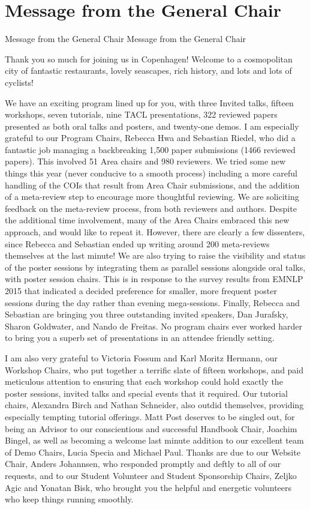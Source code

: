 \section{Message from the General Chair}\vspace{2em}
\setheaders%
    {Message from the General Chair}%
    {Message from the General Chair}
\thispagestyle{emptyheader}

\setlength{\parskip}{1ex}

Thank you so much for joining us in Copenhagen!  Welcome to a cosmopolitan city of fantastic restaurants, lovely seascapes, rich history, and lots and lots of cyclists! 

We have an exciting program lined up for you, with three Invited talks, fifteen workshops, seven tutorials, nine TACL presentations, 322 reviewed papers presented as both oral talks and posters, and twenty-one demos.  I am especially grateful to our Program Chairs, Rebecca Hwa and Sebastian Riedel, who did a fantastic job managing a backbreaking 1,500 paper submissions (1466 reviewed papers).  This involved 51 Area chairs and 980 reviewers.  We tried some new things this year (never conducive to a smooth process) including a more careful handling of the COIs that result from Area Chair submissions, and the addition of a meta-review step to encourage more thoughtful reviewing.  We are soliciting feedback on the meta-review process, from both reviewers and authors.  Despite the additional time involvement, many of the Area Chairs embraced this new approach, and would like to repeat it. However, there are clearly a few dissenters, since Rebecca and Sebastian ended up writing around 200 meta-reviews themselves at the last minute!  We are also trying to raise the visibility and status of the poster sessions by integrating them as parallel sessions alongside oral talks, with poster session chairs.  This is in response to the survey results from EMNLP 2015 that indicated a decided preference for smaller, more frequent poster sessions during the day rather than evening mega-sessions.  Finally, Rebecca and Sebastian are bringing you three outstanding invited speakers, Dan Jurafsky, Sharon Goldwater, and Nando de Freitas.   No program chairs ever worked harder to bring you a superb set of presentations in an attendee friendly setting.

I am also very grateful to Victoria Fossum and Karl Moritz Hermann, our Workshop Chairs, who put together a terrific slate of fifteen workshops, and paid meticulous attention to ensuring that each workshop could hold exactly the poster sessions, invited talks and special events that it required.  Our tutorial chairs, Alexandra Birch and Nathan Schneider, also outdid themselves, providing especially tempting tutorial offerings.  Matt Post deserves to be singled out, for being an Advisor to our conscientious and successful Handbook Chair, Joachim Bingel, as well as becoming a welcome last minute addition to our excellent team of Demo Chairs, Lucia Specia and Michael Paul.  Thanks are due to our Website Chair, Anders Johannsen, who responded promptly and deftly to all of our requests, and to our Student Volunteer and Student Sponsorship Chairs, Zeljko Agic and Yonatan Bisk, who brought you the helpful and energetic volunteers who keep things running smoothly.

